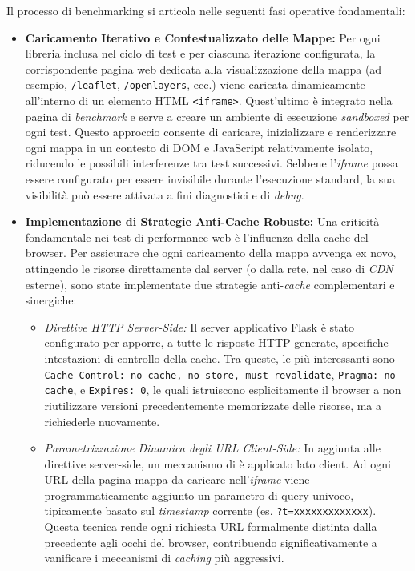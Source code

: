 \noindent
Il processo di benchmarking si articola nelle seguenti fasi operative fondamentali:

\begin{itemize}[leftmargin=*]
  \item \textbf{Caricamento Iterativo e Contestualizzato delle Mappe:} Per ogni
    libreria inclusa nel ciclo di test e per ciascuna iterazione configurata, la
    corrispondente pagina web dedicata alla visualizzazione della mappa (ad
    esempio, \texttt{/leaflet}, \texttt{/openlayers}, ecc.) viene caricata dinamicamente
    all'interno di un elemento HTML \texttt{<iframe>}. Quest'ultimo è integrato nella
    pagina di \textit{benchmark} e serve a creare un ambiente di esecuzione
    \textit{sandboxed} per ogni test. Questo approccio consente di caricare, inizializzare
    e renderizzare ogni mappa in un contesto di DOM e JavaScript relativamente isolato,
    riducendo le possibili interferenze tra test successivi. Sebbene l'\textit{iframe}
    possa essere configurato per essere invisibile durante l'esecuzione standard,
    la sua visibilità può essere attivata a fini diagnostici e di \textit{debug}.

  \item \textbf{Implementazione di Strategie Anti-Cache Robuste:} Una criticità
    fondamentale nei test di performance web è l'influenza della cache del
    browser. Per assicurare che ogni caricamento della mappa avvenga ex novo,
    attingendo le risorse direttamente dal server (o dalla rete, nel caso di
    \textit{CDN} esterne), sono state implementate due strategie anti-\textit{cache}
    complementari e sinergiche:
    \begin{itemize}
      \item \textit{Direttive HTTP Server-Side:} Il server applicativo Flask è
        stato configurato per apporre, a tutte le risposte HTTP generate,
        specifiche intestazioni di controllo della cache. Tra queste, le più
        interessanti sono \texttt{Cache-Control: no-cache, no-store, must-revalidate},
        \texttt{Pragma: no-cache}, e \texttt{Expires: 0}, le quali istruiscono
        esplicitamente il browser a non riutilizzare versioni precedentemente
        memorizzate delle risorse, ma a richiederle nuovamente.

      \item \textit{Parametrizzazione Dinamica degli URL Client-Side:} In
        aggiunta alle direttive server-side, un meccanismo di 
        è applicato lato client. Ad ogni URL della pagina mappa da caricare nell'\textit{iframe}
        viene programmaticamente aggiunto un parametro di query univoco, tipicamente
        basato sul \textit{timestamp} corrente (es. \texttt{?t=xxxxxxxxxxxxx}). Questa
        tecnica rende ogni richiesta URL formalmente distinta dalla precedente agli
        occhi del browser, contribuendo significativamente a vanificare i
        meccanismi di \textit{caching} più aggressivi.
    \end{itemize}


\end{itemize}
